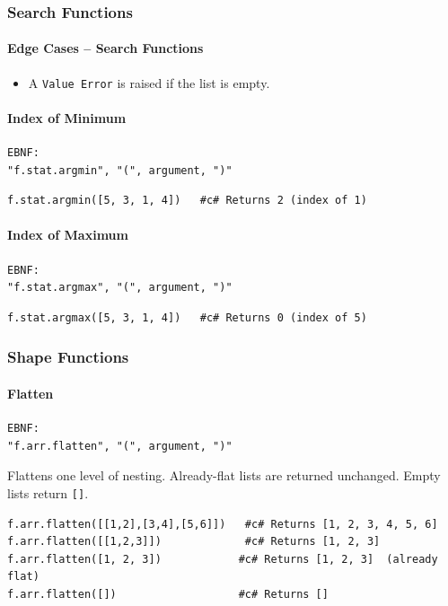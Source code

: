 \subsubsection{Search Functions}

\paragraph{Edge Cases -- Search Functions}
\begin{itemize}
\item A \texttt{Value Error} is raised if the list is empty.
\end{itemize}

\paragraph{Index of Minimum}
\begin{verbatim}
EBNF:
"f.stat.argmin", "(", argument, ")"
\end{verbatim}
\begin{verbatim}
f.stat.argmin([5, 3, 1, 4])   #c# Returns 2 (index of 1)
\end{verbatim}

\paragraph{Index of Maximum}
\begin{verbatim}
EBNF:
"f.stat.argmax", "(", argument, ")"
\end{verbatim}
\begin{verbatim}
f.stat.argmax([5, 3, 1, 4])   #c# Returns 0 (index of 5)
\end{verbatim}

\subsubsection{Shape Functions}
\paragraph{Flatten}
\begin{verbatim}
EBNF:
"f.arr.flatten", "(", argument, ")"
\end{verbatim}
Flattens one level of nesting. Already-flat lists are returned unchanged. Empty lists return \texttt{[]}.
\begin{verbatim}
f.arr.flatten([[1,2],[3,4],[5,6]])   #c# Returns [1, 2, 3, 4, 5, 6]
f.arr.flatten([[1,2,3]])             #c# Returns [1, 2, 3]
f.arr.flatten([1, 2, 3])            #c# Returns [1, 2, 3]  (already flat)
f.arr.flatten([])                   #c# Returns []
\end{verbatim}

